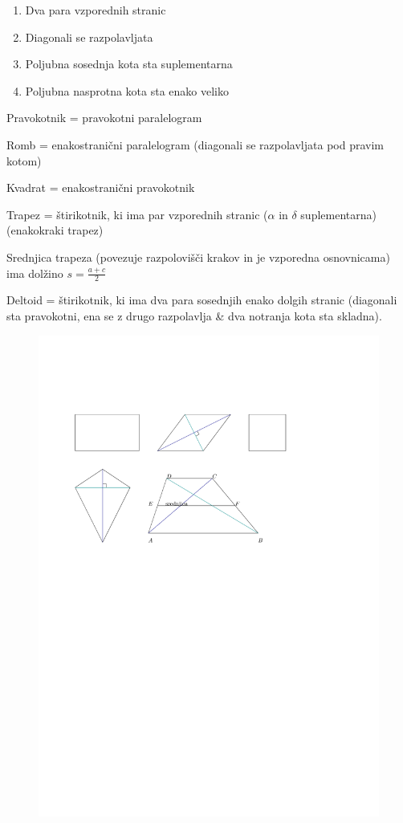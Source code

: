 \documentclass{article}
\begin{document}
\begin{enumerate}[i]
    \item Dva para vzporednih stranic
    \item Diagonali se razpolavljata
    \item Poljubna sosednja kota sta suplementarna
    \item Poljubna nasprotna kota sta enako veliko
  \end{enumerate}


Pravokotnik = pravokotni paralelogram

Romb = enakostranični paralelogram (diagonali se razpolavljata pod pravim kotom)

Kvadrat = enakostranični pravokotnik

Trapez = štirikotnik, ki ima par vzporednih stranic ($\alpha$ in $\delta$ suplementarna) (enakokraki trapez)

Srednjica trapeza (povezuje razpolovišči krakov in je vzporedna osnovnicama) ima dolžino $s=\frac{a+c}{2}$

Deltoid = štirikotnik, ki ima dva para sosednjih enako dolgih stranic (diagonali sta pravokotni, ena se z drugo razpolavlja \& dva notranja kota sta skladna).

\begin{figure}[H]
    \includegraphics[width=1\textwidth]{liki.pdf}
    \centering
\end{figure}
\end{document}
